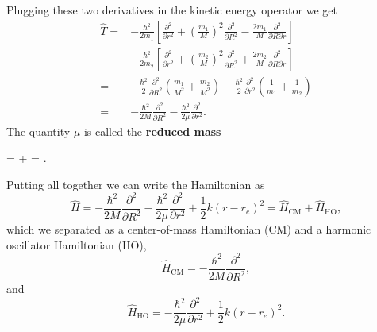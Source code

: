 \documentclass[../Main/chem331-notes.tex]{subfiles}
\begin{document}
Plugging these two derivatives in the kinetic energy operator we get
\begin{align}
\hat{T} = & -\frac{\hbar^2}{2 m_1} \left[
\frac{\partial^2}{\partial r^2} + \left(\frac{m_1}{M}\right)^2\frac{\partial^2}{\partial R^2} - \frac{2 m_1}{M}\frac{\partial^2}{\partial R \partial r}
\right] \\
  & -\frac{\hbar^2}{2 m_2} 
   \left[
\frac{\partial^2}{\partial r^2} + \left(\frac{m_2}{M}\right)^2\frac{\partial^2}{\partial R^2} + \frac{2 m_2}{M}\frac{\partial^2}{\partial R \partial r}
   \right] \\
= &  -\frac{\hbar^2}{2} \frac{\partial^2}{\partial R^2} \left(\frac{m_1}{M^2} + \frac{m_2}{M^2}\right)   -\frac{\hbar^2}{2} \frac{\partial^2}{\partial r^2} \left(\frac{1}{m_1} + \frac{1}{m_2}  \right)  \\
= & -\frac{\hbar^2}{2M} \frac{\partial^2}{\partial R^2} -\frac{\hbar^2}{2 \mu} \frac{\partial^2}{\partial r^2} .
\end{align}
The quantity $\mu$ is called the \textbf{reduced mass}
\begin{iequation}
\mu =  +  = .
\end{iequation}
Putting all together we can write the Hamiltonian as
\begin{equation}
\hat{H} =  -\frac{\hbar^2}{2M} \frac{\partial^2}{\partial R^2} -\frac{\hbar^2}{2 \mu} \frac{\partial^2}{\partial r^2} + \frac{1}{2} k (r - r_e)^2 = \hat{H}_\mathrm{CM} + \hat{H}_\mathrm{HO},
\end{equation}
which we separated as a center-of-mass Hamiltonian (CM) and a harmonic oscillator Hamiltonian (HO),
\begin{equation}
\hat{H}_\mathrm{CM} = -\frac{\hbar^2}{2M} \frac{\partial^2}{\partial R^2},
\end{equation}
and
\begin{equation}
\hat{H}_\mathrm{HO} = -\frac{\hbar^2}{2 \mu} \frac{\partial^2}{\partial r^2} + \frac{1}{2} k (r - r_e)^2.
\end{equation}
\end{document}
